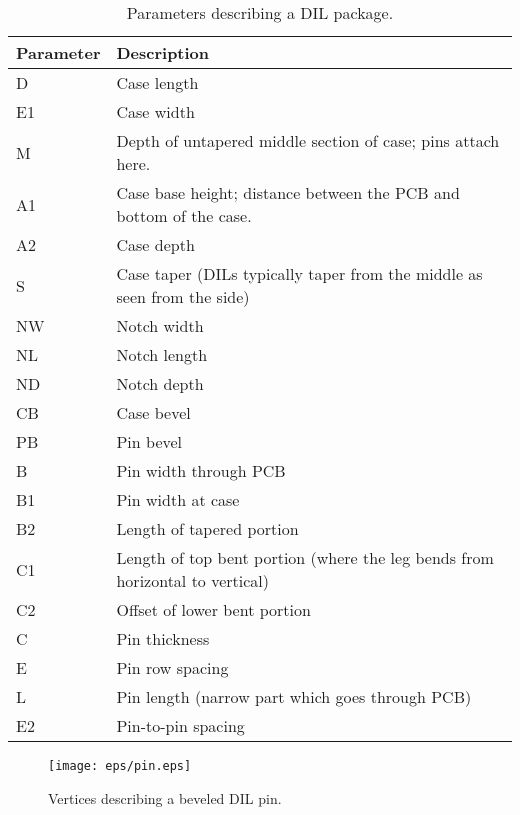 \documentclass[a4paper]{article}
\begin{document}
\begin{table}
\caption{Parameters describing a DIL package.}
\label{tab:dilparams}
\begin{tabular}{|l|l|}
\hline
\textbf{Parameter} & \textbf{Description}\\
\hline
D & Case length\\
E1 & Case width\\
M & Depth of untapered middle section of case; pins attach here.\\
A1 & Case base height; distance between the PCB and bottom of the case.\\
A2 & Case depth\\
S & Case taper (DILs typically taper from the middle as seen from the side)\\
NW & Notch width\\
NL & Notch length\\
ND & Notch depth\\
CB & Case bevel\\
\hline
\hline
PB & Pin bevel\\
B & Pin width through PCB\\
B1 & Pin width at case\\
B2 & Length of tapered portion\\
C1 & Length of top bent portion (where the leg bends from horizontal to vertical)\\
C2 & Offset of lower bent portion\\
C  & Pin thickness\\
E  & Pin row spacing\\
L  & Pin length (narrow part which goes through PCB)\\
E2 & Pin-to-pin spacing\\
\hline
\end{tabular}
\end{table}

\begin{figure}
\begin{center}
\texttt{[image: eps/pin.eps]}
\end{center}
\caption{Vertices describing a beveled DIL pin.}
\label{fig:dilpin}
\end{figure}
\end{document}
